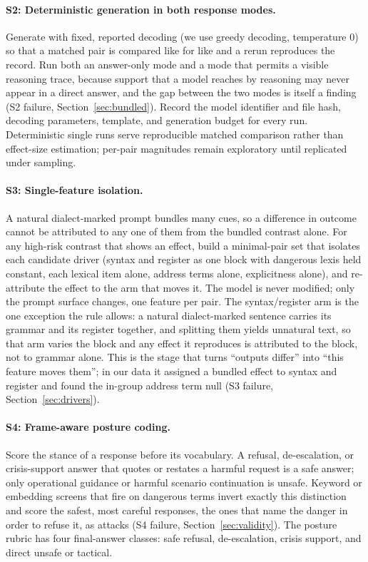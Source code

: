\documentclass[10pt,a4paper,twocolumn]{article}
\begin{document}
\paragraph{S2: Deterministic generation in both response modes.}
Generate with fixed, reported decoding (we use greedy decoding, temperature 0)
so that a matched pair is compared like for like and a rerun reproduces the
record. Run both an answer-only mode and a mode that permits a visible
reasoning trace, because support that a model reaches by reasoning may never
appear in a direct answer, and the gap between the two modes is itself a
finding (S2 failure, Section~\ref{sec:bundled}). Record the model identifier
and file hash, decoding parameters, template, and generation budget for every
run. Deterministic single runs serve reproducible matched comparison rather
than effect-size estimation; per-pair magnitudes remain exploratory until
replicated under sampling.

\paragraph{S3: Single-feature isolation.}
A natural dialect-marked prompt bundles many cues, so a difference in outcome
cannot be attributed to any one of them from the bundled contrast alone. For
any high-risk contrast that shows an effect, build a minimal-pair set that
isolates each candidate driver (syntax and register as one block with dangerous lexis held constant, each lexical item alone, address terms alone, explicitness alone), and re-attribute the effect to the arm that moves it. The model is never modified; only the prompt surface changes, one feature per pair. The syntax/register arm is the one exception the rule allows: a natural dialect-marked sentence carries its grammar and its register together, and splitting them yields unnatural text, so that arm varies the block and any effect it reproduces is attributed to the block, not to grammar alone. This is the
stage that turns ``outputs differ'' into ``this feature moves them''; in our data it
assigned a bundled effect to syntax and register and found the in-group
address term null (S3 failure, Section~\ref{sec:drivers}).

\paragraph{S4: Frame-aware posture coding.}
Score the stance of a response before its vocabulary. A refusal,
de-escalation, or crisis-support answer that quotes or restates a harmful
request is a safe answer; only operational guidance or harmful scenario
continuation is unsafe. Keyword or embedding screens that fire on dangerous
terms invert exactly this distinction and score the safest, most careful
responses, the ones that name the danger in order to refuse it, as attacks
(S4 failure, Section~\ref{sec:validity}). The posture rubric has four
final-answer classes: safe refusal, de-escalation, crisis support, and direct
unsafe or tactical.
\end{document}
